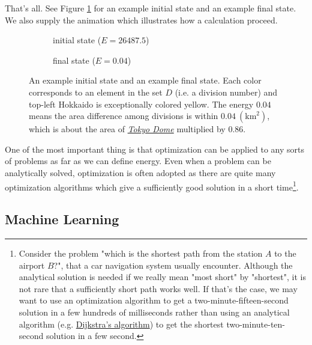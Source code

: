 \documentclass{article}
\theoremstyle{definition}
\newcommand{\fig}[1]{Figure \ref{fig:#1}}
\begin{document}
\enter\indent
That's all. See \fig{1.1} for an example initial state and an example final state. We also supply the animation \href{fig/fig\_1\_1.gif}{} which illustrates how a calculation proceed.

\begin{figure}
    \centering
    \begin{subfigure}[b]{0.49\textwidth}
        \caption{initial state ($E = 26487.5$)}
	\end{subfigure}
    \begin{subfigure}[b]{0.49\textwidth}
        \caption{final state ($E = 0.04$)}
	\end{subfigure}
    \caption{An example initial state and an example final state. Each color corresponds to an element in the set $D$ (i.e. a division number) and top-left Hokkaido is exceptionally colored yellow. The energy $0.04$ means the area difference among divisions is within $0.04\ (\text{km}^2)$, which is about the area of \href{https://en.wikipedia.org/wiki/Tokyo_Dome}{\it Tokyo Dome} multiplied by $0.86$.}
    \label{fig:1.1}
\end{figure}

\enter\indent
One of the most important thing is that optimization can be applied to any sorts of problems as far as we can define energy. Even when a problem can be analytically solved, optimization is often adopted as there are quite many optimization algorithms which give a sufficiently good solution in a short time\footnote{Consider the problem "which is the shortest path from the station $A$ to the airport $B$?", that a car navigation system usually encounter. Although the analytical solution is needed if we really mean "most short" by "shortest", it is not rare that a sufficiently short path works well. If that's the case, we may want to use an optimization algorithm to get a two-minute-fifteen-second solution in a few hundreds of milliseconds rather than using an analytical algorithm (e.g. \href{https://en.wikipedia.org/wiki/Dijkstra\%27s\_algorithm}{Dijkstra's algorithm}) to get the shortest two-minute-ten-second solution in a few second.}.

\newpage


\subsection{Machine Learning} \label{section:1.2}
\end{document}
